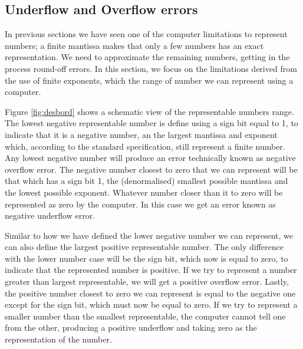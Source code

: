 \begin{paracol}{2}
\subsection{Underflow and Overflow errors}  
In previous sections we have seen one of the computer limitations to represent numbers; a finite mantissa makes that only a few numbers has an exact representation. We need to approximate the remaining numbers, getting in the process round-off errors. In this section, we focus on the limitations derived from the use of finite exponents, which the range of number we can represent using a computer.

Figure \ref{fig:desbord} shows a schematic view of the representable numbers range. The lowest negative representable number is define using a sign bit equal to 1, to indicate that it is a negative number, an the largest mantissa and exponent which, according to the standard specification, still represent a finite number. Any lowest negative number will produce an error technically known as negative overflow error. The negative number closest to zero that we can represent will be that which has a sign bit 1, the (denormalised) smallest possible mantissa and the lowest possible exponent. Whatever number closer than it to zero will be represented as zero by the computer. In this case we get an error known as negative underflow error.

Similar to how we have defined the lower negative number we can represent, we can also define the largest positive representable number. The only difference with the lower number case will be the sign bit, which now is equal to zero, to indicate that the represented number is positive. If we try to represent a number greater than largest representable, we will get a positive overflow error. Lastly, the positive number closest to zero we can represent is equal to the negative one except for the sign bit, which must now be equal to zero. If we try to represent a smaller number than the smallest representable, the computer cannot tell one from the other, producing a positive underflow and taking zero as the representation of the number.    

\end{paracol}

